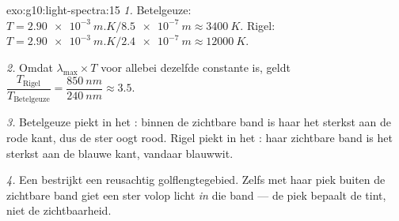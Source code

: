 \begin{solution}{exo:g10:light-spectra:15}
\emph{1.} Betelgeuze:
$T = \qty{2.90e-3}{m.K} / \qty{8.5e-7}{m} \approx \qty{3400}{K}$. Rigel:
$T = \qty{2.90e-3}{m.K} / \qty{2.4e-7}{m} \approx \qty{12000}{K}$.

\emph{2.} Omdat $\lambda_{\max} \times T$ voor allebei dezelfde constante
is, geldt $\dfrac{T_{\text{Rigel}}}{T_{\text{Betelgeuze}}}
= \dfrac{\qty{850}{nm}}{\qty{240}{nm}} \approx 3.5$.

\emph{3.} Betelgeuze piekt in het : binnen de zichtbare band is
haar  het sterkst aan de rode kant, dus de ster oogt rood. Rigel
piekt in het : haar zichtbare band is het sterkst aan de
blauwe kant, vandaar blauwwit.

\emph{4.} Een  bestrijkt een reusachtig
golflengtegebied. Zelfs met haar piek buiten de zichtbare band giet een
ster volop licht \emph{in} die band --- de piek bepaalt de tint, niet de
zichtbaarheid.
\end{solution}


